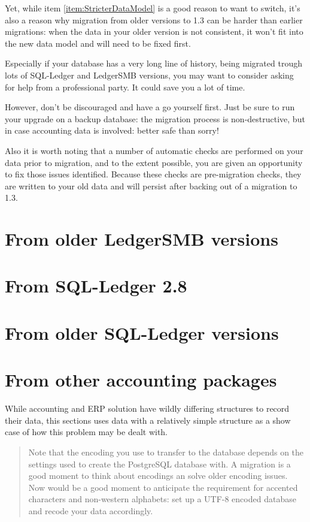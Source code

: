 Yet, while item \ref{item:StricterDataModel} is a good reason to want to switch, it's
also a reason why migration from older versions to 1.3 can be harder than earlier
migrations: when the data
in your older version is not consistent, it won't fit into the new data model and
will need to be fixed first.

Especially if your database has a very long line of history, being migrated trough
lots of SQL-Ledger and LedgerSMB versions, you may want to consider asking for help
from a professional party. It could save you a lot of time.

However, don't be discouraged and have a go yourself first. Just be sure to run
your upgrade on a backup database: the migration process is non-destructive, but
in case accounting data is involved: better safe than sorry!

Also it is worth noting that a number of automatic checks are performed on your
data prior to migration, and to the extent possible, you are given an
opportunity to fix those issues identified.  Because these checks are
pre-migration checks, they are written to your old data and will persist after
backing out of a migration to 1.3.

\section{From older LedgerSMB versions}

\section{From SQL-Ledger 2.8}

\section{From older SQL-Ledger versions}

\section{From other accounting packages}

While accounting and ERP solution have wildly differing structures to record their
data, this sections uses data with a relatively simple structure as a show case of
how this problem may be dealt with.

\begin{quote}
Note that the encoding you use to transfer to the database depends on the settings
used to create the PostgreSQL database with.  A migration is a good moment to think
about encodings an solve older encoding issues.  Now would be a good moment to
anticipate the requirement for accented characters and non-western alphabets: set up
a UTF-8 encoded database and recode your data accordingly.
\end{quote}

